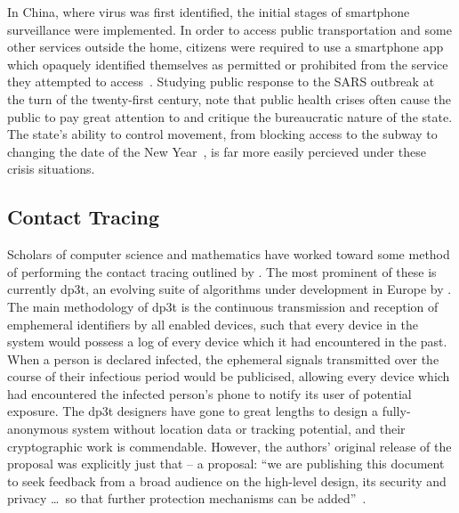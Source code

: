 \documentclass[2020/08/28 v2]{../../../coursework}
\begin{document}
In China, where \ac{virus} was first identified, the initial stages of smartphone
surveillance were implemented. In order to access public transportation and some
other services outside the home, citizens were required to use a smartphone app
which opaquely identified themselves as permitted or prohibited from the service
they attempted to access~\parencite{NYT.alipay}.
Studying public response to the SARS outbreak at the turn of the twenty-first century,
\textcite{Lee2009} note that public health crises often cause the public
to pay great attention to and critique the bureaucratic nature of the state.
The state's ability to control movement, from blocking access to the subway to
changing the date of the New Year~\parencite{Chen2020}, is far more easily percieved
under these crisis situations.

\subsection{Contact Tracing}

Scholars of computer science and mathematics have worked toward some method of
performing the contact tracing outlined by \textcite{Ferretti2020}. The most
prominent of these is currently \ac{dp3t}, an evolving suite of algorithms
under development in Europe by \textcite{DP-3T}. The main methodology of
\ac{dp3t} is the continuous transmission and reception of emphemeral identifiers
by all enabled devices, such that every device in the system would possess a log
of every device which it had encountered in the past. When a person is declared
infected, the ephemeral signals transmitted over the course of their
infectious period would be publicised, allowing every device which had
encountered the infected person's phone to notify its user of potential exposure.
The \ac{dp3t} designers have gone to great lengths to design a fully-anonymous
system without location data or tracking potential, and their cryptographic work
is commendable. However, the authors' original release of the proposal was
explicitly just that -- a proposal: \enquote{we are publishing this document to
seek feedback from a broad audience on the high-level design, its security and
privacy \dots\ so that further protection mechanisms can be added}~\parencite[2]{DP-3T}.
\end{document}
